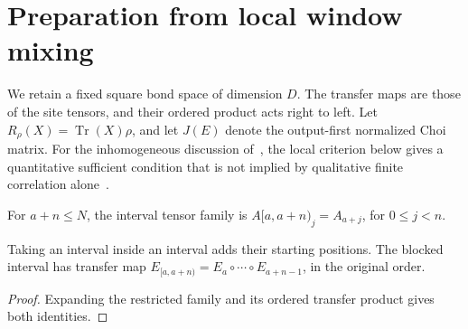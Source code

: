 \section{Preparation from local window mixing}
\label{sec:ldp_window_mixing}

We retain a fixed square bond space of dimension $D$. The transfer maps
are those of the site tensors, and their ordered product acts
right to left. Let $R_\rho(X)=\operatorname{Tr}(X)\rho$, and let $J(E)$
denote the output-first normalized Choi matrix. For the inhomogeneous
discussion of~\cite{Malz2024Preparation}, the local criterion below gives
a quantitative sufficient condition that is not implied by qualitative
finite correlation alone~\cite{gap:mswc24_inhomogeneous_scope}.

\begin{definition}
    \label{def:ldp_actual_interval}
    \leanok
    For $a+n\le N$, the interval tensor family is
    $A[a,a+n)_j=A_{a+j}$, for $0\le j<n$.
\end{definition}

\begin{lemma}
    \label{thm:ldp_actual_interval_transfer}
    \leanok
    Taking an interval inside an interval adds their starting positions.
    The blocked interval has transfer map
    $E_{[a,a+n)}=E_a\circ\cdots\circ E_{a+n-1}$, in the original order.
\end{lemma}
\begin{proof}\leanok
    Expanding the restricted family and its ordered transfer product gives
    both identities.
\end{proof}

